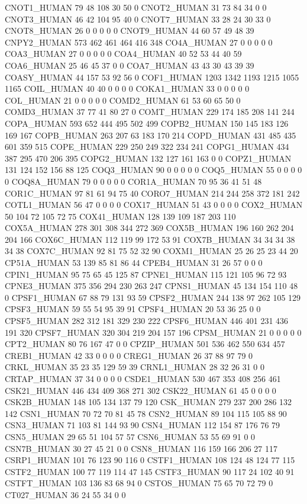 CNOT1_HUMAN	79	48	108	30	50	0
CNOT2_HUMAN	31	73	84	34	0	0
CNOT3_HUMAN	46	42	104	95	40	0
CNOT7_HUMAN	33	28	24	30	33	0
CNOT8_HUMAN	26	0	0	0	0	0
CNOT9_HUMAN	44	60	57	49	48	39
CNPY2_HUMAN	573	462	461	464	416	348
CO4A_HUMAN	27	0	0	0	0	0
COA3_HUMAN	27	0	0	0	0	0
COA4_HUMAN	40	52	53	44	40	59
COA6_HUMAN	25	46	45	37	0	0
COA7_HUMAN	43	43	30	43	39	39
COASY_HUMAN	44	157	53	92	56	0
COF1_HUMAN	1203	1342	1193	1215	1055	1165
COIL_HUMAN	40	40	0	0	0	0
COKA1_HUMAN	33	0	0	0	0	0
COL_HUMAN	21	0	0	0	0	0
COMD2_HUMAN	61	53	60	65	50	0
COMD3_HUMAN	37	77	41	80	27	0
COMT_HUMAN	229	174	185	208	141	244
COPA_HUMAN	593	652	444	495	502	499
COPB2_HUMAN	150	145	183	126	169	167
COPB_HUMAN	263	207	63	183	170	214
COPD_HUMAN	431	485	435	601	359	515
COPE_HUMAN	229	250	249	322	234	241
COPG1_HUMAN	434	387	295	470	206	395
COPG2_HUMAN	132	127	161	163	0	0
COPZ1_HUMAN	131	124	152	156	88	125
COQ3_HUMAN	90	0	0	0	0	0
COQ5_HUMAN	55	0	0	0	0	0
COQ8A_HUMAN	79	0	0	0	0	0
COR1A_HUMAN	70	95	36	41	51	48
COR1C_HUMAN	97	81	61	94	75	40
CORO7_HUMAN	214	244	258	372	181	242
COTL1_HUMAN	56	47	0	0	0	0
COX17_HUMAN	51	43	0	0	0	0
COX2_HUMAN	50	104	72	105	72	75
COX41_HUMAN	128	139	109	187	203	110
COX5A_HUMAN	278	301	308	344	272	369
COX5B_HUMAN	196	160	262	204	204	166
COX6C_HUMAN	112	119	99	172	53	91
COX7B_HUMAN	34	34	34	38	34	38
COX7C_HUMAN	92	81	75	52	32	90
COXM1_HUMAN	25	26	25	23	44	20
CP51A_HUMAN	53	139	85	81	86	44
CPEB4_HUMAN	31	26	57	0	0	0
CPIN1_HUMAN	95	75	65	45	125	87
CPNE1_HUMAN	115	121	105	96	72	93
CPNE3_HUMAN	375	356	294	230	263	247
CPNS1_HUMAN	45	134	154	110	48	0
CPSF1_HUMAN	67	88	79	131	93	59
CPSF2_HUMAN	244	138	97	262	105	129
CPSF3_HUMAN	59	55	54	95	39	91
CPSF4_HUMAN	20	53	36	25	0	0
CPSF5_HUMAN	282	312	181	329	230	222
CPSF6_HUMAN	446	401	231	436	191	320
CPSF7_HUMAN	320	304	219	204	157	196
CPSM_HUMAN	21	0	0	0	0	0
CPT2_HUMAN	80	76	167	47	0	0
CPZIP_HUMAN	501	536	462	550	634	457
CREB1_HUMAN	42	33	0	0	0	0
CREG1_HUMAN	26	37	88	97	79	0
CRKL_HUMAN	35	23	35	129	59	39
CRNL1_HUMAN	28	32	26	31	0	0
CRTAP_HUMAN	37	34	0	0	0	0
CSDE1_HUMAN	530	467	353	408	256	461
CSK21_HUMAN	446	434	409	368	271	302
CSK22_HUMAN	61	45	0	0	0	0
CSK2B_HUMAN	148	105	134	137	79	120
CSK_HUMAN	279	237	200	286	132	142
CSN1_HUMAN	70	72	70	81	45	78
CSN2_HUMAN	89	104	115	105	88	90
CSN3_HUMAN	71	103	81	144	93	90
CSN4_HUMAN	112	154	87	176	76	79
CSN5_HUMAN	29	65	51	104	57	57
CSN6_HUMAN	53	55	69	91	0	0
CSN7B_HUMAN	30	27	45	21	0	0
CSN8_HUMAN	116	159	166	206	27	117
CSRP1_HUMAN	101	76	123	90	116	0
CSTF1_HUMAN	108	124	48	124	77	115
CSTF2_HUMAN	100	77	119	114	47	145
CSTF3_HUMAN	90	117	24	102	40	91
CSTFT_HUMAN	103	136	83	68	94	0
CSTOS_HUMAN	75	65	70	72	79	0
CT027_HUMAN	36	24	55	34	0	0
